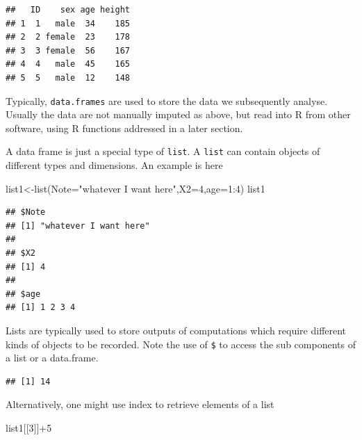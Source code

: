\documentclass[
]{article}
\newenvironment{Shaded}{\begin{snugshade}}{\end{snugshade}}
\newcommand{\AttributeTok}[1]{\textcolor[rgb]{0.77,0.63,0.00}{#1}}
\newcommand{\DecValTok}[1]{\textcolor[rgb]{0.00,0.00,0.81}{#1}}
\newcommand{\FunctionTok}[1]{\textcolor[rgb]{0.00,0.00,0.00}{#1}}
\newcommand{\NormalTok}[1]{#1}
\newcommand{\OtherTok}[1]{\textcolor[rgb]{0.56,0.35,0.01}{#1}}
\newcommand{\SpecialCharTok}[1]{\textcolor[rgb]{0.00,0.00,0.00}{#1}}
\newcommand{\StringTok}[1]{\textcolor[rgb]{0.31,0.60,0.02}{#1}}
\begin{document}
\begin{verbatim}
##   ID    sex age height
## 1  1   male  34    185
## 2  2 female  23    178
## 3  3 female  56    167
## 4  4   male  45    165
## 5  5   male  12    148
\end{verbatim}

Typically, \texttt{data.frames} are used to store the data we
subsequently analyse. Usually the data are not manually imputed as
above, but read into R from other software, using R functions addressed
in a later section.

A data frame is just a special type of \texttt{list}. A \texttt{list}
can contain objects of different types and dimensions. An example is
here

\begin{Shaded}
\begin{Highlighting}[]
\NormalTok{list1}\OtherTok{\textless{}{-}}\FunctionTok{list}\NormalTok{(}\AttributeTok{Note=}\StringTok{"whatever I want here"}\NormalTok{,}\AttributeTok{X2=}\DecValTok{4}\NormalTok{,}\AttributeTok{age=}\DecValTok{1}\SpecialCharTok{:}\DecValTok{4}\NormalTok{)}
\NormalTok{list1}
\end{Highlighting}
\end{Shaded}

\begin{verbatim}
## $Note
## [1] "whatever I want here"
## 
## $X2
## [1] 4
## 
## $age
## [1] 1 2 3 4
\end{verbatim}

Lists are typically used to store outputs of computations which require
different kinds of objects to be recorded. Note the use of \texttt{\$}
to access the sub components of a list or a data.frame.

\begin{Shaded}
\end{Shaded}

\begin{verbatim}
## [1] 14
\end{verbatim}

Alternatively, one might use index to retrieve elements of a list

\begin{Shaded}
\begin{Highlighting}[]
\NormalTok{list1[[}\DecValTok{3}\NormalTok{]]}\SpecialCharTok{+}\DecValTok{5}
\end{Highlighting}
\end{Shaded}
\end{document}
